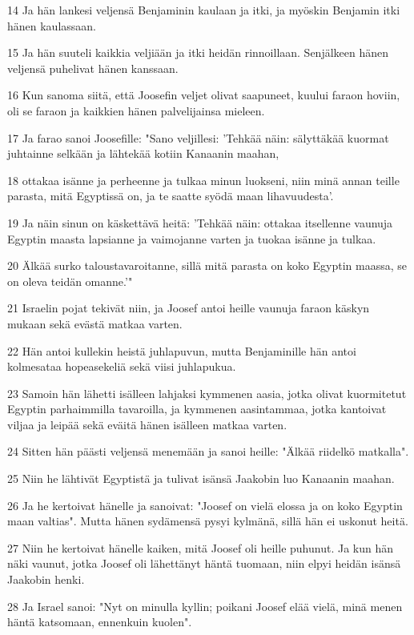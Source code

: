 \par 14 Ja hän lankesi veljensä Benjaminin kaulaan ja itki, ja myöskin Benjamin itki hänen kaulassaan.
\par 15 Ja hän suuteli kaikkia veljiään ja itki heidän rinnoillaan. Senjälkeen hänen veljensä puhelivat hänen kanssaan.
\par 16 Kun sanoma siitä, että Joosefin veljet olivat saapuneet, kuului faraon hoviin, oli se faraon ja kaikkien hänen palvelijainsa mieleen.
\par 17 Ja farao sanoi Joosefille: "Sano veljillesi: 'Tehkää näin: sälyttäkää kuormat juhtainne selkään ja lähtekää kotiin Kanaanin maahan,
\par 18 ottakaa isänne ja perheenne ja tulkaa minun luokseni, niin minä annan teille parasta, mitä Egyptissä on, ja te saatte syödä maan lihavuudesta'.
\par 19 Ja näin sinun on käskettävä heitä: 'Tehkää näin: ottakaa itsellenne vaunuja Egyptin maasta lapsianne ja vaimojanne varten ja tuokaa isänne ja tulkaa.
\par 20 Älkää surko taloustavaroitanne, sillä mitä parasta on koko Egyptin maassa, se on oleva teidän omanne.'"
\par 21 Israelin pojat tekivät niin, ja Joosef antoi heille vaunuja faraon käskyn mukaan sekä evästä matkaa varten.
\par 22 Hän antoi kullekin heistä juhlapuvun, mutta Benjaminille hän antoi kolmesataa hopeasekeliä sekä viisi juhlapukua.
\par 23 Samoin hän lähetti isälleen lahjaksi kymmenen aasia, jotka olivat kuormitetut Egyptin parhaimmilla tavaroilla, ja kymmenen aasintammaa, jotka kantoivat viljaa ja leipää sekä eväitä hänen isälleen matkaa varten.
\par 24 Sitten hän päästi veljensä menemään ja sanoi heille: "Älkää riidelkö matkalla".
\par 25 Niin he lähtivät Egyptistä ja tulivat isänsä Jaakobin luo Kanaanin maahan.
\par 26 Ja he kertoivat hänelle ja sanoivat: "Joosef on vielä elossa ja on koko Egyptin maan valtias". Mutta hänen sydämensä pysyi kylmänä, sillä hän ei uskonut heitä.
\par 27 Niin he kertoivat hänelle kaiken, mitä Joosef oli heille puhunut. Ja kun hän näki vaunut, jotka Joosef oli lähettänyt häntä tuomaan, niin elpyi heidän isänsä Jaakobin henki.
\par 28 Ja Israel sanoi: "Nyt on minulla kyllin; poikani Joosef elää vielä, minä menen häntä katsomaan, ennenkuin kuolen".

